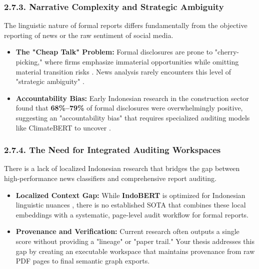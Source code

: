 \documentclass{article}
\begin{document}
\subsubsection*{2.7.3. Narrative Complexity and Strategic Ambiguity}

The linguistic nature of formal reports differs fundamentally from the objective reporting of news or the raw sentiment of social media.
\begin{itemize}
\item 

\textbf{The "Cheap Talk" Problem:} Formal disclosures are prone to "cherry-picking," where firms emphasize immaterial opportunities while omitting material transition risks  \parencite{julia_bingler_268445e3}. News analysis rarely encounters this level of "strategic ambiguity"  \parencite{julia_bingler_268445e3}.\item 

\textbf{Accountability Bias:} Early Indonesian research in the construction sector found that \textbf{68\%–79\%} of formal disclosures were overwhelmingly positive, suggesting an "accountability bias" that requires specialized auditing models like ClimateBERT to uncover  \parencite[]{julia_bingler_268445e3, iman_harymawan_f157109e}.
\end{itemize}
\subsubsection*{2.7.4. The Need for Integrated Auditing Workspaces}

There is a lack of localized Indonesian research that bridges the gap between high-performance news classifiers and comprehensive report auditing.
\begin{itemize}
\item 

\textbf{Localized Context Gap:} While \textbf{IndoBERT} is optimized for Indonesian linguistic nuances  \parencite{christofer_octovianto_487e90aa}, there is no established SOTA that combines these local embeddings with a systematic, page-level audit workflow for formal reports.\item 

\textbf{Provenance and Verification:} Current research often outputs a single score without providing a "lineage" or "paper trail." Your thesis addresses this gap by creating an executable workspace that maintains provenance from raw PDF pages to final semantic graph exports.
\end{itemize}
\end{document}

